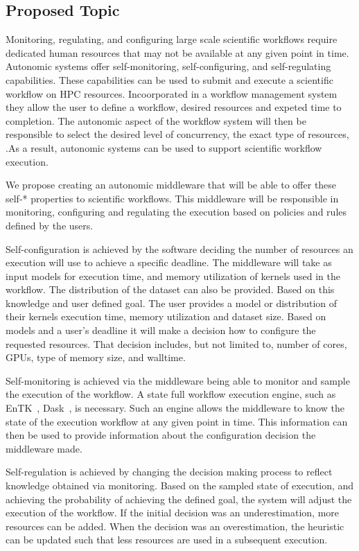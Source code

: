 \subsection{Proposed Topic}

Monitoring, regulating, and configuring large scale scientific workflows require dedicated human resources that may not be available at any given point in time. Autonomic systems offer self-monitoring, self-configuring, and self-regulating capabilities.  These capabilities can be used to submit and execute a scientific workflow on HPC resources. Incoorporated in a workflow management system they allow the user to define a workflow, desired resources and expeted time to completion. The autonomic aspect of the workflow system will then be responsible to select the desired level of concurrency, the exact type of resources, .As a result, autonomic systems can be used to support scientific workflow execution.

We propose creating an autonomic middleware that will be able to offer these self-* properties to scientific workflows. This middleware will be responsible in monitoring, configuring and regulating the execution based on policies and rules defined by the users. 

Self-configuration is achieved by the software deciding the number of resources an execution will use to achieve a specific deadline. The middleware will take as input models for execution time, and memory utilization of kernels used in the workflow. The distribution of the dataset can also be provided. Based on this knowledge and user defined goal. The user provides a model or distribution of their kernels execution time, memory utilization and dataset size. Based on models and a user's deadline it will make a decision how to configure the requested resources. That decision includes, but not limited to, number of cores, GPUs, type of memory size, and walltime.

Self-monitoring is achieved via the middleware being able to monitor and sample the execution of the workflow. A state full workflow execution engine, such as EnTK~\cite{balasubramanian2018harnessing}, Dask~\cite{rocklin2015dask}, is necessary. Such an engine allows the middleware to know the state of the execution workflow at any given point in time. This information can then be used to provide information about the configuration decision the middleware made.

Self-regulation is achieved by changing the decision making process to reflect knowledge obtained via monitoring. Based on the sampled state of execution, and achieving the probability of achieving the defined goal, the system will adjust the execution of the workflow. If the initial decision was an underestimation, more resources can be added. When the decision was an overestimation, the heuristic can be updated such that less resources are used in a subsequent execution.

